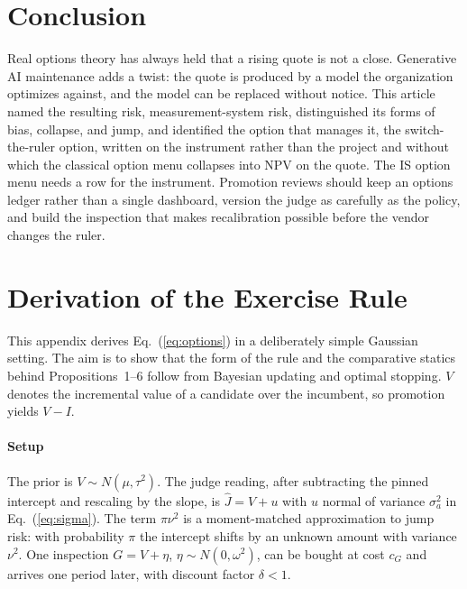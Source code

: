 \documentclass[acmsmall,screen,review,anonymous]{acmart}
\theoremstyle{acmdefinition}
\begin{document}
\section{Conclusion}\label{sec:conclusion}

Real options theory has always held that a rising quote is not a close. Generative AI maintenance adds a twist: the quote is produced by a model the organization optimizes against, and the model can be replaced without notice. This article named the resulting risk, measurement-system risk, distinguished its forms of bias, collapse, and jump, and identified the option that manages it, the switch-the-ruler option, written on the instrument rather than the project and without which the classical option menu collapses into NPV on the quote. The IS option menu needs a row for the instrument. Promotion reviews should keep an options ledger rather than a single dashboard, version the judge as carefully as the policy, and build the inspection that makes recalibration possible before the vendor changes the ruler.




\appendix

\section{Derivation of the Exercise Rule}\label{app:rule}

This appendix derives Eq.~(\ref{eq:options}) in a deliberately simple Gaussian setting. The aim is to show that the form of the rule and the comparative statics behind Propositions~1--6 follow from Bayesian updating and optimal stopping. $V$ denotes the incremental value of a candidate over the incumbent, so promotion yields $V - I$.

\paragraph{Setup} The prior is $V \sim N(\mu,\tau^2)$. The judge reading, after subtracting the pinned intercept and rescaling by the slope, is $\hat{J} = V + u$ with $u$ normal of variance $\sigma_a^2$ in Eq.~(\ref{eq:sigma}). The term $\pi\nu^2$ is a moment-matched approximation to jump risk: with probability $\pi$ the intercept shifts by an unknown amount with variance $\nu^2$. One inspection $G = V + \eta$, $\eta \sim N(0,\omega^2)$, can be bought at cost $c_G$ and arrives one period later, with discount factor $\delta < 1$.
\end{document}
